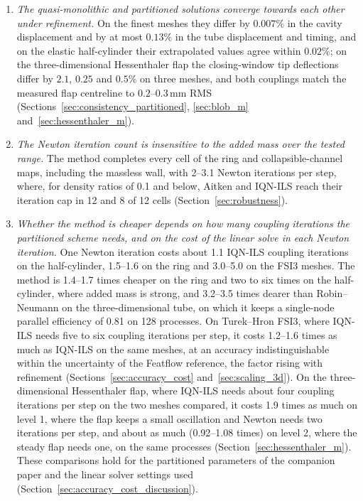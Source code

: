 \begin{enumerate}
	\item \emph{The quasi-monolithic and partitioned solutions converge towards each other under refinement.} On the finest meshes they differ by $0.007\%$ in the cavity displacement and by at most $0.13\%$ in the tube displacement and timing, and on the elastic half-cylinder their extrapolated values agree within $0.02\%$; on the three-dimensional Hessenthaler flap the closing-window tip deflections differ by $2.1$, $0.25$ and $0.5\%$ on three meshes, and both couplings match the measured flap centreline to $0.2$--$0.3\,\mathrm{mm}$ RMS (Sections~\ref{sec:consistency_partitioned}, \ref{sec:blob_m} and~\ref{sec:hessenthaler_m}).
	\item \emph{The Newton iteration count is insensitive to the added mass over the tested range.} The method completes every cell of the ring and collapsible-channel maps, including the massless wall, with 2--3.1 Newton iterations per step, where, for density ratios of 0.1 and below, Aitken and IQN-ILS reach their iteration cap in 12 and 8 of 12 cells (Section~\ref{sec:robustness}).
	\item \emph{Whether the method is cheaper depends on how many coupling iterations the partitioned scheme needs, and on the cost of the linear solve in each Newton iteration.} One Newton iteration costs about 1.1 IQN-ILS coupling iterations on the half-cylinder, 1.5--1.6 on the ring and 3.0--5.0 on the FSI3 meshes. The method is 1.4--1.7 times cheaper on the ring and two to six times on the half-cylinder, where added mass is strong, and 3.2--3.5 times dearer than Robin--Neumann on the three-dimensional tube, on which it keeps a single-node parallel efficiency of 0.81 on 128 processes. On Turek--Hron FSI3, where IQN-ILS needs five to six coupling iterations per step, it costs 1.2--1.6 times as much as IQN-ILS on the same meshes, at an accuracy indistinguishable within the uncertainty of the Featflow reference, the factor rising with refinement (Sections~\ref{sec:accuracy_cost} and~\ref{sec:scaling_3d}). On the three-dimensional Hessenthaler flap, where IQN-ILS needs about four coupling iterations per step on the two meshes compared, it costs 1.9 times as much on level 1, where the flap keeps a small oscillation and Newton needs two iterations per step, and about as much (0.92--1.08 times) on level 2, where the steady flap needs one, on the same processes (Section~\ref{sec:hessenthaler_m}). These comparisons hold for the partitioned parameters of the companion paper and the linear solver settings used (Section~\ref{sec:accuracy_cost_discussion}).
\end{enumerate}

